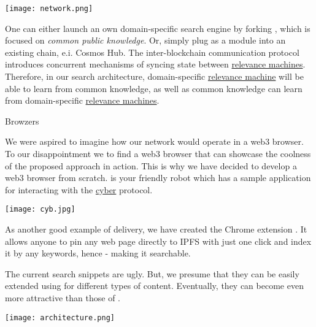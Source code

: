 \documentclass[8pt,oneside]{amsart}
\makeatletter
\newcommand{\linkred}[2]{\href{#1}{\color{red}{#2}}}
\renewcommand\subsection{\@startsection{subsection}
                                    {2}{\z@}
                                    {-3.25ex\@plus -1ex \@minus -.2ex}
                                    {0ex \@plus .2ex}
                                    {\play\Large}
                        }
\newcommand{\titleSection}[1]{\subsection{#1}}
\newenvironment{Figure}
  {\par\medskip\noindent\minipage{\linewidth}}
  {\endminipage\par\medskip}
\makeatother
\begin{document}
\begin{Figure}
    \centering
    \texttt{[image: network.png]}
\end{Figure}

One can either launch an own domain-specific search engine by forking \linkred{https://github.com/cybercongress/cyberd}{cyberd}, which is focused on \textit{common public knowledge}. Or, simply plug \linkred{https://github.com/cybercongress/cyberd}{cyberd} as a module into an existing chain, e.i. Cosmos Hub. The inter-blockchain communication protocol introduces concurrent mechanisms of syncing state between {\hyperref[relevance-machine]{relevance machines}}. Therefore, in our search architecture, domain-specific {\hyperref[relevance-machine]{relevance machine}} will be able to learn from common knowledge, as well as common knowledge can learn from domain-specific {\hyperref[relevance-machine]{relevance machines}}.

\titleSection{Browzers}\label{browzers}

We were aspired to imagine how our network would operate in a web3 browser. To our disappointment we \linkred{https://github.com/cybercongress/cyb/blob/master/docs/comparison.md}{were not able} to find a web3 browser that can showcase the coolness of the proposed approach in action. This is why we have decided to develop a web3 browser from scratch. \linkred{https://cyb.ai}{Cyb} is your friendly robot which has a sample \linkred{https://cyber.page}{.cyber} application for interacting with the {\hyperref[cyber]{cyber}} protocol.

\begin{Figure}
  \medskip
  \centering
  \texttt{[image: cyb.jpg]}
  \medskip
\end{Figure}

As another good example of delivery, we have created the Chrome extension \linkred{https://github.com/cybercongress/cyb-virus}{cyb-virus}. It allows anyone to pin any web page directly to IPFS with just one click and index it by any keywords, hence - making it searchable.

The current search snippets are ugly. But, we presume that they can be easily extended using \linkred{https://github.com/ipld/specs}{IPLD} for different types of content. Eventually, they can become even more attractive than those of \linkred{https://google.com}{Google}.

\begin{Figure}
    \centering
    \texttt{[image: architecture.png]}
\end{Figure}
\end{document}
